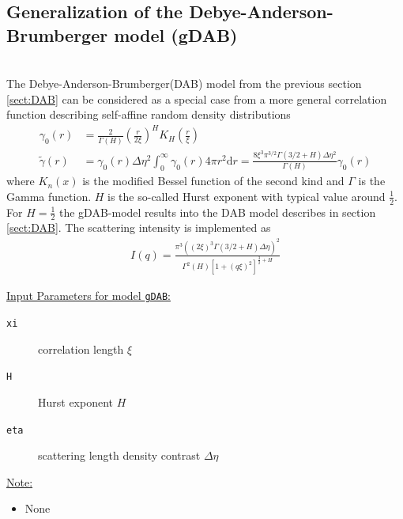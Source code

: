 
\clearpage
\subsection{Generalization of the Debye-Anderson-Brumberger model (gDAB)}
\label{sect:gDAB}~\\
The Debye-Anderson-Brumberger(DAB) model from the previous section \ref{sect:DAB} can be considered as a special case from a more general correlation function describing self-affine random density distributions \cite{Klimes2002,Hunter2006,Andersson2008}
\begin{align}
\gamma_0(r) &=
\frac{2}{\Gamma(H)}\left(\frac{r}{2\xi}\right)^H K_H\left(\frac{r}{\xi}\right) \\
\tilde{\gamma}(r) &= \gamma_0(r) \Delta\eta^2 \int_0^\infty \gamma_0(r) 4\pi r^2 \mathrm{d}r = \frac{8\xi^3\pi^{3/2}\Gamma(3/2+H)\Delta\eta^2}{\Gamma(H)}\gamma_0(r)
\end{align}
where $K_n(x)$ is the modified Bessel function of the second kind
and $\Gamma$ is the Gamma function. $H$ is the so-called Hurst
exponent with typical value around $\frac12$. For $H=\frac12$ the gDAB-model results into the DAB model describes in section \ref{sect:DAB}. The scattering intensity is implemented as
\begin{align}
I(q) =  \frac{\pi^3\left(\left(2\xi\right)^3\Gamma(3/2+H)\Delta\eta\right)^2}{\Gamma^2(H)\left[1+(q\xi)^2\right]^{\frac32+H}}
\end{align}


\underline{Input Parameters for model \texttt{gDAB}:}\\
\begin{description}
\item[\texttt{xi}] correlation length $\xi$
\item[\texttt{H}] Hurst exponent $H$
\item[\texttt{eta}] scattering length density contrast $\Delta\eta$
\end{description}

\underline{Note:}
\begin{itemize}
\item None
\end{itemize}


